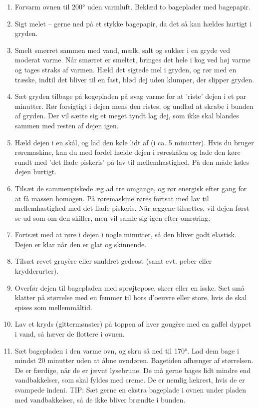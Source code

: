 \documentclass[
]{book}
\begin{document}
\begin{enumerate}
\def\labelenumi{\arabic{enumi}.}
\item
  Forvarm ovnen til 200° uden varmluft. Beklæd to bageplader med bagepapir.
\item
  Sigt melet -- gerne ned på et stykke bagepapir, da det så kan hældes hurtigt i gryden.
\item
  Smelt smørret sammen med vand, mælk, salt og sukker i en gryde ved moderat varme. Når smørret er
  smeltet, bringes det hele i kog ved høj varme og tages straks af varmen. Hæld det sigtede mel i gryden,
  og rør med en træske, indtil det bliver til en fast, blød dej uden klumper, der slipper gryden.
\item
  Sæt gryden tilbage på kogepladen på svag varme for at 'riste' dejen i et par minutter. Rør forsigtigt i
  dejen mens den ristes, og undlad at skrabe i bunden af gryden. Der vil sætte sig et meget tyndt lag dej,
  som ikke skal blandes sammen med resten af dejen igen.
\item
  Hæld dejen i en skål, og lad den køle lidt af (i ca. 5 minutter). Hvis du bruger røremaskine, kan du
  med fordel hælde dejen i røreskålen og lade den køre rundt med 'det flade piskeris' på lav til
  mellemhastighed. På den måde køles dejen hurtigt.
\item
  Tilsæt de sammenpiskede æg ad tre omgange, og rør energisk efter gang for at få massen homogen.
  På røremaskine røres fortsat med lav til mellemhastighed med det flade piskeris. Når æggene tilsættes,
  vil dejen først se ud som om den skiller, men vil samle sig igen efter omrøring.
\item
  Fortsæt med at røre i dejen i nogle minutter, så den bliver godt elastisk. Dejen er klar når den er glat
  og skinnende.
\item
  Tilsæt revet gruyère eller snuldret gedeost (samt evt. peber eller krydderurter).
\item
  Overfør dejen til bagepladen med sprøjtepose, skeer eller en isske. Sæt små klatter på størrelse med
  en femmer til hors d'oeuvre eller store, hvis de skal spises som mellemmåltid.
\item
  Lav et kryds (gittermønster) på toppen af hver gougère med en gaffel dyppet i vand, så hæver de
  flottere i ovnen.
\item
  Sæt bagepladen i den varme ovn, og skru så ned til 170°. Lad dem bage i mindst 20 minutter uden at
  åbne ovndøren. Bagetiden afhænger af størrelsen. De er færdige, når de er jævnt lysebrune. De må
  gerne bages lidt mindre end vandbakkelser, som skal fyldes med creme. De er nemlig lækrest, hvis de er
  svampede indeni.
  TIP: Sæt gerne en ekstra bageplade i ovnen under pladen med vandbakkelser, så de ikke bliver brændte
  i bunden.
\end{enumerate}
\end{document}
